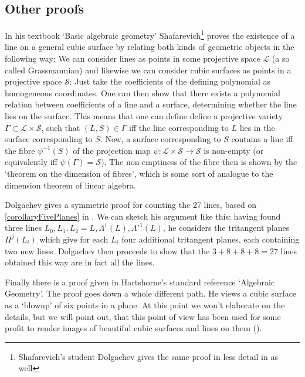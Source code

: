 \subsection{Other proofs}

In his textbook `Basic algebraic geometry' Shafarevich\footnote{Shafarevich's student Dolgachev gives the same proof in less detail in \cite[theorem 9.1.13]{dolgachev2012classical} as well} proves the existence of a line on a general cubic surface by relating both kinds of geometric objects in the following way:
We can consider lines as points in some projective space $\mathcal L$ (a so called Grassmannian) and likewise we can consider cubic surfaces as points in a projective space $\mathcal S$: Just take the coefficients of the defining polynomial as homogeneous coordinates.
One can then show that there exists a polynomial relation between coefficients of a line and a surface, determining whether the line lies on the surface.
This means that one can define define a projective variety $\Gamma \subset \mathcal L \times \mathcal S$, such that $(L,S) \in \Gamma$ iff the line corresponding to $L$ lies in the surface corresponding to $S$.
Now, a surface corresponding to $S$ contains a line iff the fibre $\psi^{-1}(S)$ of the projection map $\psi : \mathcal L \times \mathcal S \to \mathcal S$ is non-empty (or equivalently iff $\psi(\Gamma) = \mathcal S$).
The non-emptiness of the fibre then is shown by the `theorem on the dimension of fibres', which is some sort of analogue to the dimension theorem of linear algebra.

Dolgachev gives a symmetric proof for counting the 27 lines, based on \ref{corollaryFivePlanes} in \cite[theorem 9.1.13]{dolgachev2012classical}.
We can sketch his argument like this: having found three lines $L_0,L_1,L_2 = L,\Lambda^1(L),\Lambda'^1(L)$, he considers the tritangent planes $\Pi^j(L_i)$ which give for each $L_i$ four additional tritangent planes, each containing two new lines.
Dolgachev then proceeds to show that the $3+8+8+8 = 27$ lines obtained this way are in fact all the lines.

Finally there is a proof given in Hartshorne's standard reference `Algebraic Geometry'.
The proof \cite[theorem 4.9]{hartshorne1977algebraic} goes down a whole different path.
He views a cubic surface as a `blowup' of six points in a plane.
At this point we won't elaborate on the details, but we will point out, that this point of view has been used for some profit to render images of beautiful cubic surfaces and lines on them (\cite{van2003visual}).
